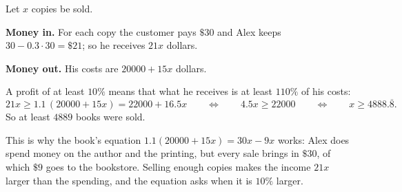 Let $x$ copies be sold.

\textbf{Money in.} For each copy the customer pays $\$30$ and Alex keeps $30-0.3\cdot30=\$21$; so he receives $21x$ dollars.

\textbf{Money out.} His costs are $20000+15x$ dollars.

A profit of at least $10\%$ means that what he receives is at least $110\%$ of his costs:
\[
21x\ge1.1\,(20000+15x)=22000+16.5x\qquad\Longleftrightarrow\qquad 4.5x\ge22000\qquad\Longleftrightarrow\qquad x\ge4888.\overline{8}.
\]
So at least $\boxed{4889}$ books were sold.

This is why the book's equation $1.1(20000+15x)=30x-9x$ works: Alex does spend money on the author and the printing, but every sale brings in $\$30$, of which $\$9$ goes to the bookstore. Selling enough copies makes the income $21x$ larger than the spending, and the equation asks when it is $10\%$ larger.
